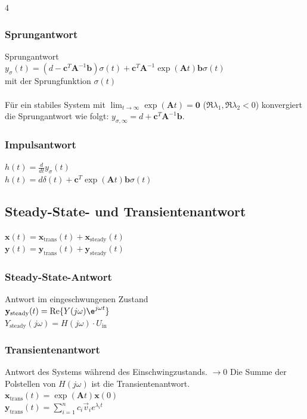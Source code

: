\documentclass[fs, footer]{latex4ei}
\begin{document}
\begin{multicols*}{4}
    \subsubsection{Sprungantwort}

    Sprungantwort \\$y_\sigma(t) = (d-\mathbf{c}^T\mathbf{A}^{-1}\mathbf{b})\sigma (t) + \mathbf{c}^T\mathbf{A}^{-1}\exp{(\mathbf{A}t)}\mathbf{b}\sigma(t)$ \\
        mit der Sprungfunktion $\sigma(t)$\\ \\
        Für ein stabiles System mit $\lim_{t\rightarrow\infty}\exp{(\mathbf{A}t)} = \mathbf{0}$ ($\Re{\lambda_1}, \Re{\lambda_2} < 0$) konvergiert die Sprungantwort wie folgt: $y_{\sigma,\infty} = d + \mathbf{c}^T\mathbf{A}^{-1}\mathbf{b}$.
        \subsubsection{Impulsantwort}
    $h(t) = \frac{d}{dt} y_\sigma(t)$\\
    $h(t) = d\delta (t) + \mathbf{c}^T\exp{(\mathbf{A}t)}\mathbf{b}\sigma(t)$
        \subsection{Steady-State- und Transientenantwort}
        $\mathbf{x}(t) = \mathbf{x}_{\text{trans}}(t) + \mathbf{x}_{\text{steady}}(t)$ \\
    $\mathbf{y}(t) = \mathbf{y}_{\text{trans}}(t) + \mathbf{y}_{\text{steady}}(t)$
        \subsubsection{Steady-State-Antwort}
        Antwort im eingeschwungenen Zustand \\
    $\mathbf{y}_{\text{steady}}(t) = \text{Re}\{Y(j\omega)\e^{j\omega t}\}$\\
    $Y_{\text{steady}}(j\omega) = H(j\omega) \cdot U_{\text{in}}$ \\
        \subsubsection{Transientenantwort}
        Antwort des Systems während des Einschwingzustands. $\rightarrow 0$
        Die Summe der Polstellen von $H(j\omega)$ ist die Transientenantwort.\\
        $\mathbf{x}_{\text{trans}}(t)=\exp(\mathbf{A}t)\mathbf{x}(0)$ \\
    $\mathbf{y}_{\text{trans}}(t)=\sum_{i=1}^{n}c_i\vec v_ie^{\lambda_i t}$ \\


\end{multicols*}
\end{document}
